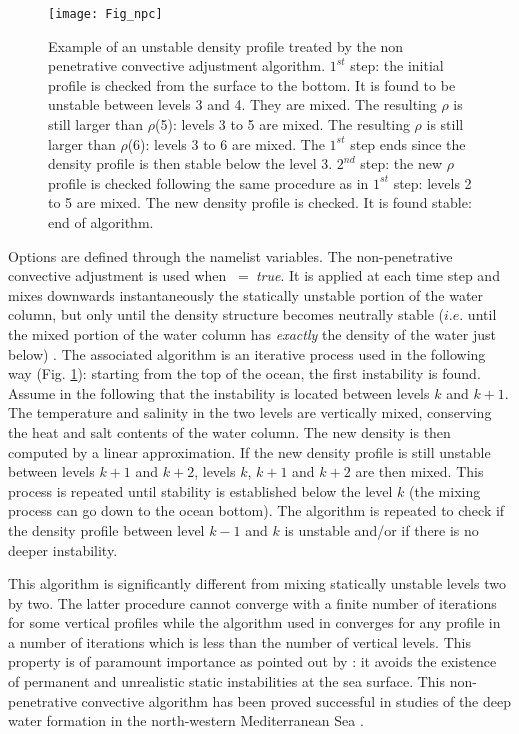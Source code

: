 \documentclass[NEMO_book]{subfiles}
\begin{document}
\begin{figure}[!htb]  	\begin{center}
\texttt{[image: Fig\_npc]}
\caption{  \label{Fig_npc} 
Example of an unstable density profile treated by the non penetrative 
convective adjustment algorithm. $1^{st}$ step: the initial profile is checked from 
the surface to the bottom. It is found to be unstable between levels 3 and 4. 
They are mixed. The resulting $\rho$ is still larger than $\rho$(5): levels 3 to 5 
are mixed. The resulting $\rho$ is still larger than $\rho$(6): levels 3 to 6 are 
mixed. The $1^{st}$ step ends since the density profile is then stable below 
the level 3. $2^{nd}$ step: the new $\rho$ profile is checked following the same 
procedure as in $1^{st}$ step: levels 2 to 5 are mixed. The new density profile 
is checked. It is found stable: end of algorithm.}
\end{center}  	\end{figure}

Options are defined through the   namelist variables.
The non-penetrative convective adjustment is used when ~=~\textit{true}. 
It is applied at each  time step and mixes downwards instantaneously 
the statically unstable portion of the water column, but only until the density 
structure becomes neutrally stable ($i.e.$ until the mixed portion of the water 
column has \textit{exactly} the density of the water just below) \citep{Madec_al_JPO91}. 
The associated algorithm is an iterative process used in the following way 
(Fig. \ref{Fig_npc}): starting from the top of the ocean, the first instability is 
found. Assume in the following that the instability is located between levels 
$k$ and $k+1$. The temperature and salinity in the two levels are 
vertically mixed, conserving the heat and salt contents of the water column. 
The new density is then computed by a linear approximation. If the new 
density profile is still unstable between levels $k+1$ and $k+2$, levels $k$, 
$k+1$ and $k+2$ are then mixed. This process is repeated until stability is 
established below the level $k$ (the mixing process can go down to the 
ocean bottom). The algorithm is repeated to check if the density profile 
between level $k-1$ and $k$ is unstable and/or if there is no deeper instability.

This algorithm is significantly different from mixing statically unstable levels 
two by two. The latter procedure cannot converge with a finite number 
of iterations for some vertical profiles while the algorithm used in \NEMO 
converges for any profile in a number of iterations which is less than the 
number of vertical levels. This property is of paramount importance as 
pointed out by \citet{Killworth1989}: it avoids the existence of permanent 
and unrealistic static instabilities at the sea surface. This non-penetrative 
convective algorithm has been proved successful in studies of the deep 
water formation in the north-western Mediterranean Sea 
\citep{Madec_al_JPO91, Madec_al_DAO91, Madec_Crepon_Bk91}.
\end{document}
